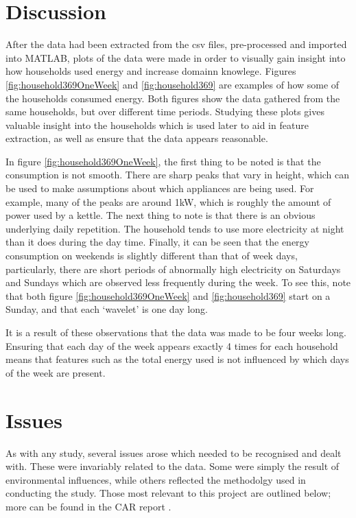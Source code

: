 \section{Discussion}

After the data had been extracted from the csv files, pre-processed and imported into MATLAB, plots of the data were made in order to visually gain insight into how households used energy and increase domainn knowlege. Figures \ref{fig:household369OneWeek} and \ref{fig:household369} are examples of how some of the households consumed energy. Both figures show the data gathered from the same households, but over different time periods. Studying these plots gives valuable insight into the households which is used later to aid in feature extraction, as well as ensure that the data appears reasonable. 

In figure \ref{fig:household369OneWeek}, the first thing to be noted is that the consumption is not smooth. There are sharp peaks that vary in height, which can be used to make assumptions about which appliances are being used. For example, many of the peaks  are around 1kW, which is roughly the amount of power used by a kettle. The next thing to note is that there is an obvious underlying daily repetition. The household tends to use more electricity at night than it does during the day time. Finally, it can be seen that the energy consumption on weekends is slightly different than that of week days, particularly, there are short periods of abnormally high electricity on Saturdays and Sundays which are observed less frequently during the week. To see this, note that both figure \ref{fig:household369OneWeek} and \ref{fig:household369} start on a Sunday, and that each `wavelet' is one day long.

It is a result of these observations that the data was made to be four weeks long. Ensuring that each day of the week appears exactly 4 times for each household means that features such as the total energy used is not influenced by which days of the week are present.

\householdOneWeek
\householdPlot




\section{Issues}

As with any study, several issues arose which needed to be recognised and dealt with.  These were invariably related to the data.  Some were simply the result of environmental influences, while others reflected the methodolgy used in conducting the study.  Those most relevant to this project are outlined below; more can be found in the CAR report \cite{early_findings}.

